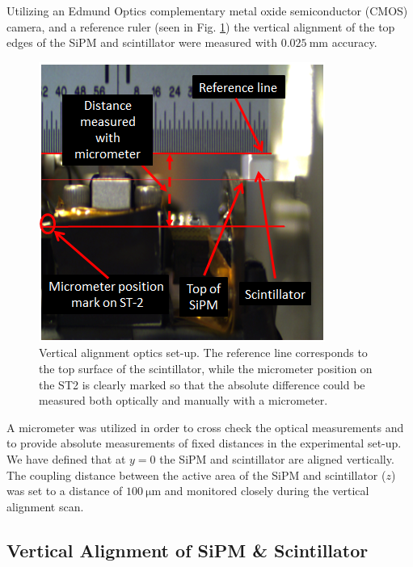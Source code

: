 Utilizing an Edmund Optics complementary metal oxide semiconductor (CMOS) camera, and a reference ruler (seen in Fig. \ref{fig:sipm_va_optics}) the vertical alignment of the top edges of the SiPM and scintillator were measured with $\mathrm{0.025~mm}$ accuracy.
	\begin{figure}[!htb]
		\centering
		\includegraphics[width=0.8\columnwidth]{misalignment/figs/sipm_va_optics}
		\caption{Vertical alignment optics set-up.  The reference line corresponds to the top surface of the scintillator, while the micrometer position on the ST2 is clearly marked so that the absolute difference could be measured both optically and manually with a micrometer.}
		\label{fig:sipm_va_optics}
	\end{figure}
A micrometer was utilized in order to cross check the optical measurements and to provide absolute measurements of fixed distances in the experimental set-up.  We have defined that at $y = 0$ the SiPM and scintillator are aligned vertically.  The coupling distance between the active area of the SiPM and scintillator ($z$) was set to a distance of $\mathrm{100\ \mu m}$ and monitored closely during the vertical alignment scan.

\subsection{Vertical Alignment of SiPM \& Scintillator}
\label{sec:misalign_vert}


